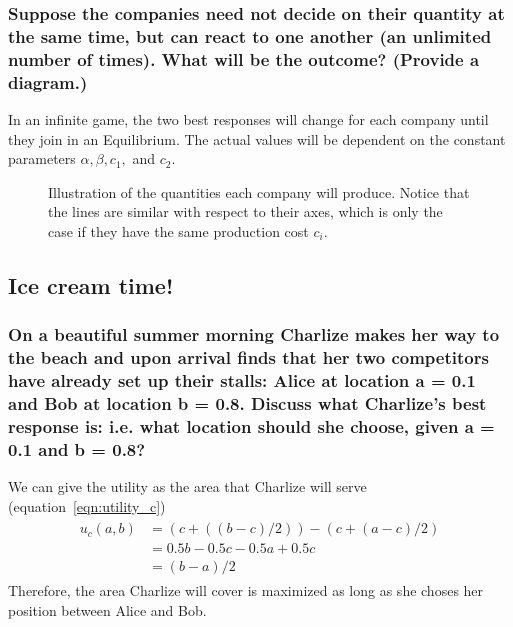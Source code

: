 \documentclass[11pt]{article}
\begin{document}
    \subsubsection{Suppose the companies need not decide on their quantity at the same time, but can react to one another (an unlimited number of times). What will be the outcome? (Provide a diagram.)}
    In an infinite game, the two best responses will change for each company until they join in an Equilibrium. The actual values
    will be dependent on the constant parameters $\alpha, \beta, c_1,$ and $c_2$.
    \begin{figure}[h]
        \caption{Illustration of the quantities each company will produce. Notice that the lines are similar with respect to their axes,
            which is only the case if they have the same production cost $c_i$.}
    \end{figure}

    \subsection{Ice cream time!}

    \subsubsection{On a beautiful summer morning Charlize makes her way to the beach and upon arrival finds that her two competitors have already set up their stalls: Alice at location a = 0.1 and Bob at location b = 0.8. Discuss what Charlize’s best response is: i.e. what location should she choose, given a = 0.1 and b = 0.8?}
    We can give the utility as the area that Charlize will serve (equation~\ref{eqn:utility_c})
    \begin{align}
        \begin{split}
            u_c(a, b)&=(c+((b-c)/2)) - (c+(a-c)/2)\\
            & = 0.5b - 0.5c - 0.5a + 0.5c\\
            & = (b-a)/2
        \end{split}
        \label{eqn:utility_c}
    \end{align}
    Therefore, the area Charlize will cover is maximized as long as she choses her position between Alice and Bob.
\end{document}
